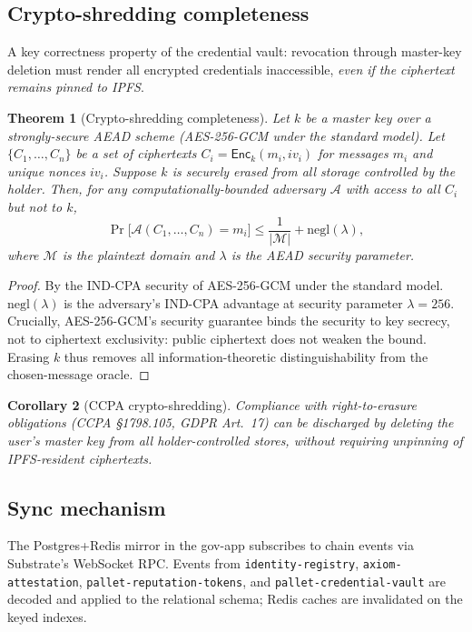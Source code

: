 \documentclass[11pt,a4paper,parskip=half-,DIV=12,headings=standardclasses]{scrartcl}
\theoremstyle{ncthm}
\newtheorem{theorem}{Theorem}[section]
\newtheorem{corollary}[theorem]{Corollary}
\theoremstyle{ncdef}
\newcommand{\Negl}{\mathrm{negl}}
\newcommand{\Enc}{\mathsf{Enc}}
\begin{document}
\subsection{Crypto-shredding completeness}

A key correctness property of the credential vault: revocation through
master-key deletion must render all encrypted credentials inaccessible,
\emph{even if the ciphertext remains pinned to IPFS}.

\begin{theorem}[Crypto-shredding completeness]\label{thm:crypto-shredding}
Let $k$ be a master key over a strongly-secure AEAD scheme (AES-256-GCM
under the standard model). Let $\{C_1, \ldots, C_n\}$ be a set of
ciphertexts $C_i = \Enc_k(m_i, iv_i)$ for messages $m_i$ and unique
nonces $iv_i$. Suppose $k$ is securely erased from all storage
controlled by the holder. Then, for any computationally-bounded
adversary $\mathcal{A}$ with access to all $C_i$ but not to $k$,
\[
\Pr\bigl[\mathcal{A}(C_1, \ldots, C_n) = m_i \bigr] \leq \frac{1}{|\mathcal{M}|} + \Negl(\lambda),
\]
where $\mathcal{M}$ is the plaintext domain and $\lambda$ is the AEAD
security parameter.
\end{theorem}

\begin{proof}
By the IND-CPA security of AES-256-GCM under the standard model.
$\Negl(\lambda)$ is the adversary's IND-CPA advantage at security
parameter $\lambda = 256$. Crucially, AES-256-GCM's security guarantee
binds the security to key secrecy, not to ciphertext exclusivity:
public ciphertext does not weaken the bound. Erasing $k$ thus removes
all information-theoretic distinguishability from the chosen-message
oracle.
\end{proof}

\begin{corollary}[CCPA crypto-shredding]\label{cor:ccpa}
Compliance with right-to-erasure obligations (CCPA \S1798.105, GDPR
Art.~17) can be discharged by deleting the user's master key from all
holder-controlled stores, without requiring unpinning of IPFS-resident
ciphertexts.
\end{corollary}

\subsection{Sync mechanism}

The Postgres+Redis mirror in the gov-app subscribes to chain events
via Substrate's WebSocket RPC. Events from \texttt{identity-registry},
\texttt{axiom-attestation}, \texttt{pallet-reputation-tokens}, and
\texttt{pallet-credential-vault} are decoded and applied to the
relational schema; Redis caches are invalidated on the keyed indexes.
\end{document}
